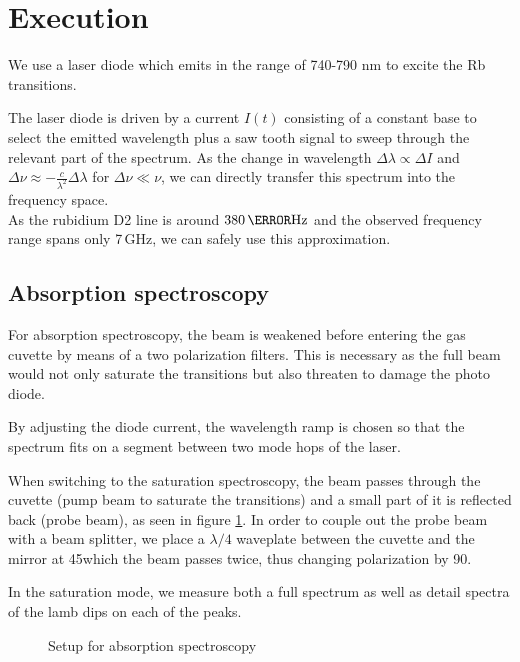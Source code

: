 
\section{Execution} %

We use a laser diode which emits in the range of 740-790 nm \cite{lit:diode} to excite the \textsf{Rb} transitions.

The laser diode is driven by a current $I(t)$ consisting of a constant base to select the emitted wavelength plus a saw tooth signal to sweep through the relevant part of the spectrum. As the change in wavelength $\Delta \lambda \propto \Delta I$ and $\Delta \nu \approx - \frac{c}{\lambda^2}\Delta \lambda$ for $\Delta \nu \ll \nu$, we can directly transfer this spectrum into the frequency space.\\
As the rubidium D2 line is around $380 \,\tera\hertz$ and the observed frequency range spans only 7\,GHz, we can safely use this approximation.

\subsection{Absorption spectroscopy}

For absorption spectroscopy, the beam is weakened before entering the gas cuvette by means of a two polarization filters. This is necessary as the full beam would not only saturate the transitions but also threaten to damage the photo diode.

By adjusting the diode current, the wavelength ramp is chosen so that the spectrum fits on a segment between two mode hops of the laser.

When switching to the saturation spectroscopy, the beam passes through the cuvette (pump beam to saturate the transitions) and a small part of it is reflected back (probe beam), as seen in figure \ref{fig:setup_abs}. In order to couple out the probe beam with a beam splitter, we place a $\lambda/4$ waveplate between the cuvette and the mirror at 45\degree which the beam passes twice, thus changing polarization by 90\degree.

In the saturation mode, we measure both a full spectrum as well as detail spectra of the lamb dips on each of the peaks.

\begin{figure}[h]
	\centering
	\def\svgwidth{\textwidth}
	
	\caption{Setup for absorption spectroscopy \cite{lit:AK_manual2012}}
	\label{fig:setup_abs}
\end{figure}

